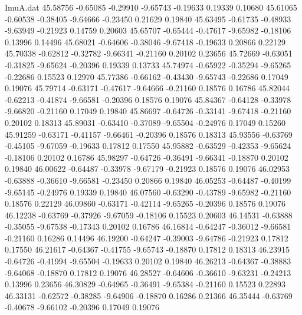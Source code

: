 \begin{filecontents}{ImuA.dat}
  45.58756   -0.65085   -0.29910   -9.65743   -0.19633    0.19339    0.10680
  45.61065   -0.60538   -0.38405   -9.64666   -0.23450    0.21629    0.19840
  45.63495   -0.61735   -0.48933   -9.63949   -0.21923    0.14759    0.20603
  45.65707   -0.65444   -0.47617   -9.65982   -0.18106    0.13996    0.14496
  45.68021   -0.64606   -0.38046   -9.67418   -0.19633    0.20866    0.22129
  45.70338   -0.62812   -0.32782   -9.66341   -0.21160    0.20102    0.23656
  45.72669   -0.63051   -0.31825   -9.65624   -0.20396    0.19339    0.13733
  45.74974   -0.65922   -0.35294   -9.65265   -0.22686    0.15523    0.12970
  45.77386   -0.66162   -0.43430   -9.65743   -0.22686    0.17049    0.19076
  45.79714   -0.63171   -0.47617   -9.64666   -0.21160    0.18576    0.16786
  45.82044   -0.62213   -0.41874   -9.66581   -0.20396    0.18576    0.19076
  45.84367   -0.64128   -0.33978   -9.66820   -0.21160    0.17049    0.19840
  45.86697   -0.64726   -0.33141   -9.67418   -0.21160    0.20102    0.18313
  45.89031   -0.63410   -0.37089   -9.65504   -0.24976    0.17049    0.15260
  45.91259   -0.63171   -0.41157   -9.66461   -0.20396    0.18576    0.18313
  45.93556   -0.63769   -0.45105   -9.67059   -0.19633    0.17812    0.17550
  45.95882   -0.63529   -0.42353   -9.65624   -0.18106    0.20102    0.16786
  45.98297   -0.64726   -0.36491   -9.66341   -0.18870    0.20102    0.19840
  46.00622   -0.64487   -0.33978   -9.67179   -0.21923    0.18576    0.19076
  46.02953   -0.63888   -0.36610   -9.66581   -0.23450    0.20866    0.19840
  46.05253   -0.64487   -0.40199   -9.65145   -0.24976    0.19339    0.19840
  46.07560   -0.63290   -0.43789   -9.65982   -0.21160    0.18576    0.22129
  46.09860   -0.63171   -0.42114   -9.65265   -0.20396    0.18576    0.19076
  46.12238   -0.63769   -0.37926   -9.67059   -0.18106    0.15523    0.20603
  46.14531   -0.63888   -0.35055   -9.67538   -0.17343    0.20102    0.16786
  46.16814   -0.64247   -0.36012   -9.66581   -0.21160    0.16286    0.14496
  46.19200   -0.64247   -0.39003   -9.64786   -0.21923    0.17812    0.17550
  46.21617   -0.64367   -0.41755   -9.65743   -0.18870    0.17812    0.18313
  46.23915   -0.64726   -0.41994   -9.65504   -0.19633    0.20102    0.19840
  46.26213   -0.64367   -0.38883   -9.64068   -0.18870    0.17812    0.19076
  46.28527   -0.64606   -0.36610   -9.63231   -0.24213    0.13996    0.23656
  46.30829   -0.64965   -0.36491   -9.65384   -0.21160    0.15523    0.22893
  46.33131   -0.62572   -0.38285   -9.64906   -0.18870    0.16286    0.21366
  46.35444   -0.63769   -0.40678   -9.66102   -0.20396    0.17049    0.19076

\end{filecontents}
